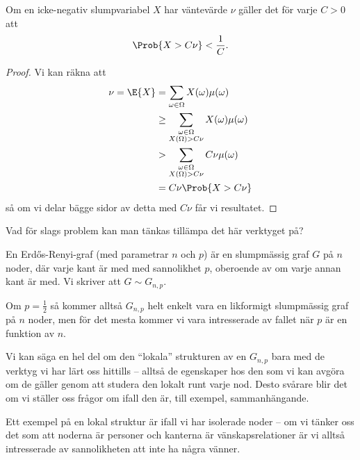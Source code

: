 \documentclass[nobib]{tufte-handout}
\begin{document}
\begin{lemma}
    Om en icke-negativ slumpvariabel $X$ har väntevärde $\nu$ gäller det för varje $C > 0$ att
    $$\Prob{X > C\nu} < \frac{1}{C}.$$

    \begin{proof}
        Vi kan räkna att
        \begin{align*}
            \nu = \E{X} &= \sum_{\omega \in \Omega} X(\omega)\mu(\omega)\\
            &\geq \sum_{\substack{\omega \in \Omega\\X(\Omega) > C\nu}} X(\omega)\mu(\omega)\\
            &> \sum_{\substack{\omega \in \Omega\\X(\Omega) > C\nu}} C\nu\mu(\omega)\\
            &= C\nu \Prob{X > C\nu}
        \end{align*}
        så om vi delar bägge sidor av detta med $C\nu$ får vi resultatet.
    \end{proof}
\end{lemma}

Vad för slags problem kan man tänkas tillämpa det här verktyget på?

\begin{definition}
    En Erd\H{o}s-Renyi-graf (med parametrar $n$ och $p$) är en slumpmässig graf $G$ på $n$ noder, där varje kant är med med sannolikhet $p$, oberoende av om varje annan kant är med. Vi skriver att $G \sim G_{n,p}$.

    Om $p = \frac{1}{2}$ så kommer alltså $G_{n,p}$ helt enkelt vara en likformigt slumpmässig graf på $n$ noder, men för det mesta kommer vi vara intresserade av fallet när $p$ är en funktion av $n$.
\end{definition}

Vi kan säga en hel del om den ``lokala'' strukturen av en $G_{n,p}$ bara med de verktyg vi har lärt oss hittills -- alltså de egenskaper hos den som vi kan avgöra om de gäller genom att studera den lokalt runt varje nod. Desto svårare blir det om vi ställer oss frågor om ifall den är, till exempel, sammanhängande.

Ett exempel på en lokal struktur är ifall vi har isolerade noder -- om vi tänker oss det som att noderna är personer och kanterna är vänskapsrelationer är vi alltså intresserade av sannolikheten att inte ha några vänner.
\end{document}
